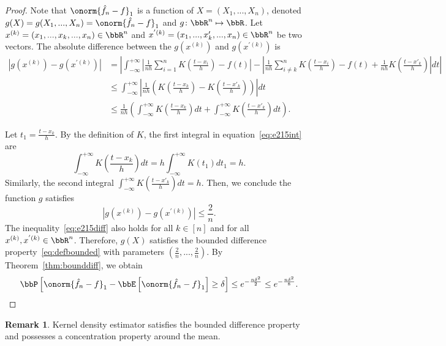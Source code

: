 \documentclass[11pt]{article}
\newcommand{\of}[1]{\left(#1\right)}
\newcommand{\off}[1]{\left[#1\right]}
\newcommand{\aabs}[1]{\left|#1\right|}
\theoremstyle{plain}
\theoremstyle{definition}
\newtheorem{rmk}{Remark}
\begin{document}
	\begin{proof}
		Note that $\onorm{\hat f_n - f}_1$ is a function of $X = (X_1,...,X_n)$, denoted $g(X) = g(X_1,...,X_n) = \onorm{\hat f_n - f}_1$ and $g\colon \bbR^n \mapsto \bbR$. Let $x^{(k)} = (x_1,...,x_k,...,x_n) \in \bbR^n$ and $x^{'(k)} = (x_1,...,x'_k,...,x_n)\in \bbR^n$ be two vectors. The absolute difference between the $g(x^{(k)})$ and $g(x^{'(k)})$ is
		\begin{align}
			|g(x^{(k)}) - g(x^{'(k)})|
			&= \aabs{\int_{-\infty}^{+\infty} \aabs{ \frac{1}{nh} \sum_{i = 1}^n K \of{\frac{t-x_i}{h}} -f(t)  } -\aabs{ \frac{1}{nh} \sum_{i \neq k}^n K \of{\frac{t-x_i}{h}} -f(t) + \frac{1}{nh} K\of{\frac{t-x'_k}{h}}   } dt} \\
			&\leq \int_{-\infty}^{+\infty} \aabs{\frac{1}{nh} \of{K\of{\frac{t-x_k}{h}} - K\of{\frac{t-x'_k}{h}}  } }dt\\
			&\leq \frac{1}{nh} \of{ \int_{-\infty}^{+\infty} K\of{\frac{t-x_k}{h}}dt + \int_{-\infty}^{+\infty} K\of{\frac{t-x'_k}{h}}dt }.  \label{eq:e215int}
		\end{align}
		
		Let $t_1 = \frac{t-x_k}{h}$. By the definition of $K$, the first integral in equation~\eqref{eq:e215int} are
		\begin{equation}
			\int_{-\infty}^{+\infty} K\of{\frac{t-x_k}{h}}dt = h\int_{-\infty}^{+\infty} K\of{t_1}dt_1 = h.
		\end{equation}
		Similarly, the second integral $\int_{-\infty}^{+\infty} K\of{\frac{t-x'_k}{h}}dt = h$. Then, we conclude the function $g$ satisfies
		\begin{equation}\label{eq:e215diff}
			|g(x^{(k)}) - g(x^{'(k)})|  \leq \frac{2}{n}.
		\end{equation}
		The inequality~\eqref{eq:e215diff} also holds for all $k \in [n]$ and for all $x^{(k)},x^{'(k)} \in \bbR^n$. Therefore, $g(X)$ satisfies the bounded difference property~\eqref{eq:defbounded} with parameters $(\frac{2}{n},..., \frac{2}{n})$. By Theorem~\ref{thm:bounddiff}, we obtain
		\begin{equation}
			\bbP\off{\onorm{\hat f_n - f}_1 - \bbE \off{\onorm{\hat f_n - f}_1} \geq \delta} \leq e^{-\frac{n\delta^2}{2}} \leq e^{-\frac{n\delta^2}{8}} .
		\end{equation}
		
	\end{proof}
	
	\begin{rmk}
		Kernel density estimator satisfies the bounded difference property and possesses a concentration property around the mean.
	\end{rmk}
	
\end{document}
